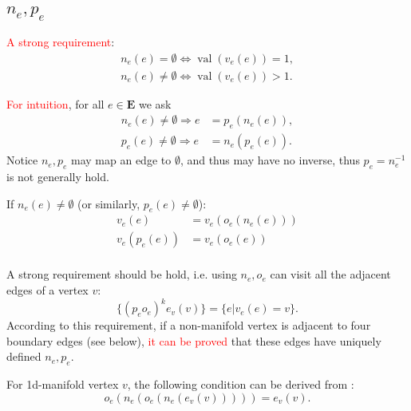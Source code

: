 \documentclass[9pt,twocolumn]{extarticle}
\newcommand{\TODO}[1]{\textcolor{red}{#1}}
\newcommand{\SET}[1]{\mathbf{#1}}
\DeclareMathOperator{\VAL}{val}
\begin{document}
\subsection{$n_e,p_e$}
\TODO{A strong requirement}:
\begin{equation}
  \begin{split}
    n_e(e) = \emptyset \Leftrightarrow \VAL(v_e(e)) = 1,\\
    n_e(e) \neq \emptyset \Leftrightarrow \VAL(v_e(e)) > 1.
  \end{split}
  \label{eq:val_n}
\end{equation}

\TODO{For intuition}, for all $e \in \SET{E}$ we ask
\begin{equation}
  \begin{split}
    n_e(e) \neq \emptyset \Rightarrow e &= p_e(n_e(e)),\\
    p_e(e) \neq \emptyset \Rightarrow e &= n_e(p_e(e)).
  \end{split}
  \label{eq:np_e}
\end{equation}
Notice $n_e,p_e$ may map an edge to $\emptyset$, and thus may have no
inverse, thus $p_e = n_e^{-1}$ is not generally hold.

If $n_e(e) \neq \emptyset$ (or similarly, $p_e(e) \neq \emptyset$):
\begin{equation}
  \begin{split}
    v_e(e) &= v_e(o_e(n_e(e)))\\
    v_e(p_e(e)) &= v_e(o_e(e))\\
  \end{split}
\end{equation}

A strong requirement should be hold, i.e. using $n_e, o_e$ can visit all the adjacent edges of a vertex $v$:
\begin{equation}
  \{(p_eo_e)^ke_v(v)\} = \{e|v_e(e) = v\}.
\end{equation}
According to this requirement, if a non-manifold vertex is adjacent to
four boundary edges (see below), \TODO{it can be proved} that these
edges have uniquely defined $n_e,p_e$.


For 1d-manifold vertex $v$, the following condition can be derived
from :
\begin{equation}
  o_e(n_e(o_e(n_e(e_v(v))))) = e_v(v).
  \label{eq:1d-manifold}
\end{equation}
\end{document}
